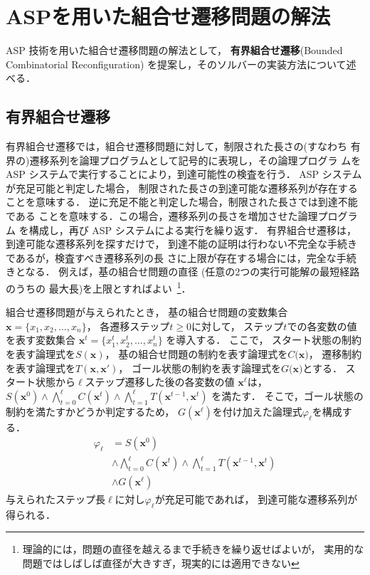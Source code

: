 ﻿%
\section{ASPを用いた組合せ遷移問題の解法}\label{chap:proposal}

ASP 技術を用いた組合せ遷移問題の解法として，
\textbf{有界組合せ遷移}(Bounded Combinatorial Reconfiguration)
を提案し，そのソルバーの実装方法について述べる．

\subsection{有界組合せ遷移}

有界組合せ遷移では，組合せ遷移問題に対して，制限された長さの(すなわち
有界の)遷移系列を論理プログラムとして記号的に表現し，その論理プログラ
ムを ASP システムで実行することにより，到達可能性の検査を行う．
ASP システムが充足可能と判定した場合，
制限された長さの到達可能な遷移系列が存在することを意味する．
逆に充足不能と判定した場合，制限された長さでは到達不能である
ことを意味する．この場合，遷移系列の長さを増加させた論理プログラム
を構成し，再び ASP システムによる実行を繰り返す．
有界組合せ遷移は，到達可能な遷移系列を探すだけで，
到達不能の証明は行わない不完全な手続きであるが，検査すべき遷移系列の長
さに上限が存在する場合には，完全な手続きとなる．
例えば，基の組合せ問題の直径 (任意の2つの実行可能解の最短経路のうちの
最大長)を上限とすればよい~\footnote{%
理論的には，問題の直径を越えるまで手続きを繰り返せばよいが，
実用的な問題ではしばしば直径が大きすぎ，現実的には適用できない}．

組合せ遷移問題が与えられたとき，
基の組合せ問題の変数集合
$\bm{x} = \{x_1,x_2,\ldots,x_n\}$，
各遷移ステップ$t\geq 0$に対して，
ステップ$t$での各変数の値を表す変数集合
$\bm{x}^{t} = \{x_1^t,x_2^t,\ldots,x_n^t\}$
を導入する．
ここで，
スタート状態の制約を表す論理式を$S(\bm{x})$，
基の組合せ問題の制約を表す論理式を$C(\bm{x)}$，
遷移制約を表す論理式を$T(\bm{x},\bm{x}')$，
ゴール状態の制約を表す論理式を$G(\bm{x)}$とする．
スタート状態から$\ell$ステップ遷移した後の各変数の値
$\bm{x}^{\ell}$は，
\(
S(\bm{x}^0) \land 
\bigwedge_{t=0}^{\ell} C(\bm{x}^t) \land
\bigwedge_{t=1}^{\ell} T(\bm{x}^{t-1},\bm{x}^{t})
\)
を満たす．
そこで，ゴール状態の制約を満たすかどうか判定するため，
$G(\bm{x}^\ell)$を付け加えた論理式$\varphi_{\ell}$を構成する．
\begin{align*}
  \varphi_{\ell} &= S(\bm{x}^0) \\
  &\land \bigwedge_{t=0}^{\ell} C(\bm{x}^t) 
  \land \bigwedge_{t=1}^{\ell} T(\bm{x}^{t-1},\bm{x}^{t}) \nonumber\\
  &\land G(\bm{x}^\ell)
\end{align*}
与えられたステップ長$\ell$に対し$\varphi_\ell$が充足可能であれば，
到達可能な遷移系列が得られる．

